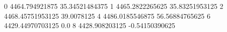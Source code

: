 0 4464.794921875 35.34521484375
1 4465.2822265625 35.83251953125
2 4468.45751953125 39.0078125
4 4486.0185546875 56.56884765625
6 4429.44970703125 0.0
8 4428.908203125 -0.54150390625
